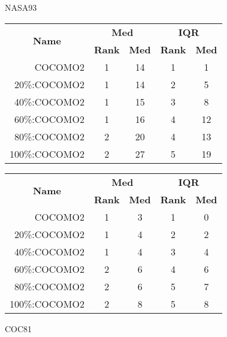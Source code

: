 \begin{figure}[!t]
\begin{center}
\caption{NASA93}
\scriptsize
\label{fig:nasa93}
\begin{tabular}{|r|c|c|c|c|}
\hline
\multicolumn{1}{|c|}{\multirow{2}{*}{\textbf{Name}}} & \multicolumn{2}{c|}{\textbf{Med}}     & \multicolumn{2}{c|}{\textbf{IQR}} \\ \cline{2-5} 
\multicolumn{1}{|c|}{}                               & \textbf{Rank} & \textbf{Med} & \textbf{Rank} & \textbf{Med} \\ \hline
    COCOMO2  & 1 & 14   & 1    & 1     \\ \cline{4-5}
20\%:COCOMO2 & 1 & 14   & 2    & 5  \\ \cline{4-5}
40\%:COCOMO2 & 1 & 15   & 3    & 8   \\ \cline{4-5}
60\%:COCOMO2 & 1 & 16   & 4    & 12   \\ \cline{2-3}
80\%:COCOMO2 & 2 & 20   & 4    & 13   \\\cline{4-5}
100\%:COCOMO2 & 2 & 27  & 5    & 19    \\ \hline  
\end{tabular}

\caption{COC81}
\scriptsize
\label{fig:coc81}
\begin{tabular}{|r|c|c|c|c|}
\hline
\multicolumn{1}{|c|}{\multirow{2}{*}{\textbf{Name}}} & \multicolumn{2}{c|}{\textbf{Med}}     & \multicolumn{2}{c|}{\textbf{IQR}} \\ \cline{2-5} 
\multicolumn{1}{|c|}{}                               & \textbf{Rank} & \textbf{Med} & \textbf{Rank} & \textbf{Med} \\ \hline
    COCOMO2  & 1 & 3   & 1    & 0     \\ \cline{4-5}
20\%:COCOMO2 & 1 & 4   & 2    & 2   \\ \cline{4-5}
40\%:COCOMO2 & 1 & 4   & 3    & 4   \\ \cline{2-5}
60\%:COCOMO2 & 2 & 6   & 4    & 6   \\ \cline{4-5}
80\%:COCOMO2 & 2 & 6   & 5    & 7   \\
100\%:COCOMO2 & 2 & 8  & 5    & 8    \\ \hline        
\end{tabular}
\end{center}
\end{figure}